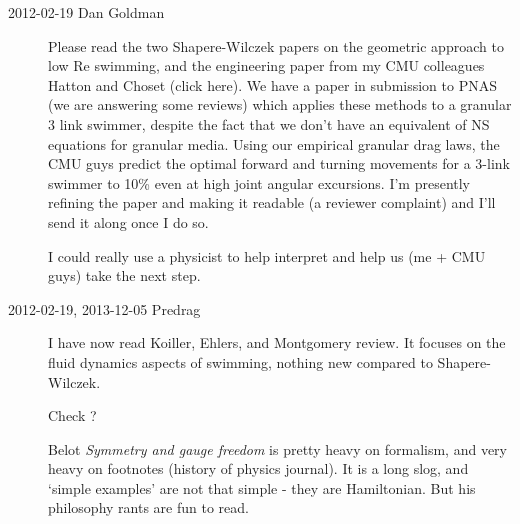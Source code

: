 
\RemarksEnd

\newpage
\begin{description}

\item[2012-02-19 Dan Goldman]
Please read the two Shapere-Wilczek papers on the
geometric approach to low Re swimming, and the engineering paper from my
CMU colleagues Hatton and Choset (click
{here}). We have a paper in submission to PNAS (we are answering some
reviews) which applies these methods to a granular 3 link swimmer,
despite the fact that we don't have an equivalent of NS equations for
granular media. Using our empirical granular drag laws, the CMU guys
predict the optimal forward and turning movements for a 3-link swimmer to
10\% even at high joint angular excursions. I'm presently refining the
paper and making it readable (a reviewer complaint) and I'll send it
along once I do so.

I could really use a physicist to help interpret and help us (me + CMU
guys) take the next step.


\item[2012-02-19, 2013-12-05 Predrag]
I have now read
Koiller, Ehlers, and Montgomery review. It focuses on the fluid
dynamics aspects of swimming, nothing new compared to Shapere-Wilczek.

Check ?

Belot \emph{Symmetry and gauge freedom} is pretty heavy on
formalism, and very heavy on footnotes (history of physics journal). It
is a long slog, and `simple examples' are not that simple - they are
Hamiltonian. But his philosophy rants are fun to read.


\end{description}
